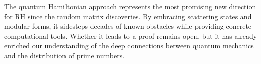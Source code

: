 \begin{conclusion}
The quantum Hamiltonian approach represents the most promising new direction for RH since the random matrix discoveries. By embracing scattering states and modular forms, it sidesteps decades of known obstacles while providing concrete computational tools. Whether it leads to a proof remains open, but it has already enriched our understanding of the deep connections between quantum mechanics and the distribution of prime numbers.
\end{conclusion}

